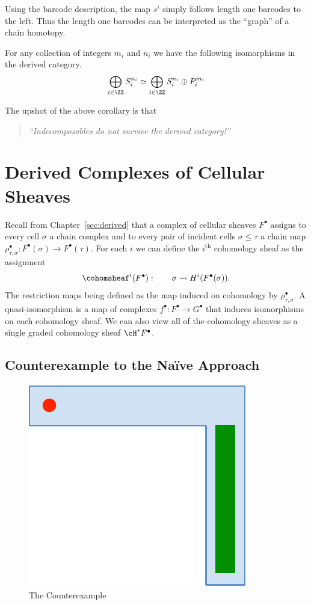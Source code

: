 \begin{rmk}
Using the barcode description, the map $s^i$ simply follows length one barcodes to the left. Thus the length one barcodes can be interpreted as the ``graph'' of a chain homotopy.
\end{rmk}

\begin{cor}
For any collection of integers $m_i$ and $n_i$ we have the following isomorphisms in the derived category.
\[
\bigoplus_{i\in\ZZ} S_i^{n_i} \simeq \bigoplus_{i\in\ZZ} S_i^{n_i}\oplus P_i^{m_i}
\]
\end{cor}
The upshot of the above corollary is that 

\begin{quote}
\centering
\emph{``Indecomposables do not survive the derived category!''}~\cite{macpherson}
\end{quote}

\section{Derived Complexes of Cellular Sheaves}
\label{subsec:derived_graded_cellsheaves}

Recall from Chapter~\ref{sec:derived} that a complex of cellular sheaves $F^{\bullet}$ assigns to every cell $\sigma$ a chain complex and to every pair of incident cells $\sigma\leq\tau$ a chain map $\rho^{\bullet}_{\tau,\sigma}:F^{\bullet}(\sigma)\to F^{\bullet}(\tau)$. For each $i$ we can define the $i^{\mathrm{th}}$ cohomology sheaf as the assignment
\[
 \cohomsheaf^i(F^{\bullet}): \qquad \sigma \rightsquigarrow H^i(F^{\bullet}(\sigma)).
\]
The restriction maps being defined as the map induced on cohomology  by $\rho^{\bullet}_{\tau,\sigma}$. A quasi-isomorphism is a map of complexes $f^{\bullet}:F^{\bullet}\to G^{\bullet}$ that induces isomorphisms on each cohomology sheaf. We can also view all of the cohomology sheaves as a single graded cohomology sheaf $\cH^{*}F^{\bullet}$.

\subsection{Counterexample to the Na\"ive Approach}

\begin{figure}
\centering
\includegraphics[width=.4\textwidth]{bar_counterex.pdf}
\caption{The Counterexample}
\label{fig:bar_counterex}
\end{figure}

